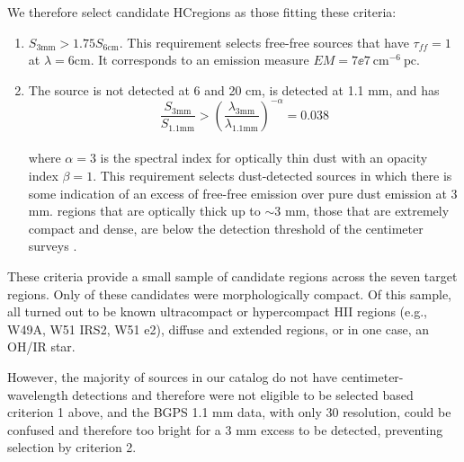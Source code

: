 \documentclass[twocolumn]{aastex62}
\begin{document}
We therefore select candidate HC\hii regions
as those fitting these criteria:
\begin{enumerate}
    \item $S_{3 \mathrm{mm}} > 1.75 S_{6 \mathrm{cm}}$.  %
        This requirement selects free-free sources that have $\tau_{ff}=1$
        at $\lambda = {6 \mathrm{cm}}$.  It corresponds to an emission
        measure ${EM=7\ee{7}~\mathrm{cm}^{-6}~\mathrm{pc}}$.
    \item
        The source is not detected at 6 and 20 cm, is detected at 1.1 mm, and has
        \begin{equation}
            \frac{S_{3 \mathrm{mm}}}{S_{1.1 \mathrm{mm}}} > \left(\frac{\lambda_{3 \mathrm{mm}}}
            {\lambda_{1.1 \mathrm{mm}}}\right)^{-\alpha} = 0.038
        \end{equation}\\
        where $\alpha=3$ is the spectral
        index for optically thin dust with an opacity index $\beta=1$.  This
        requirement selects dust-detected sources in which there is some
        indication of an excess of free-free emission over pure dust emission
        at 3 mm.
        \hchii regions that are optically
        thick up to $\sim3$ mm, those that are extremely compact and dense,
        are below the detection threshold of the centimeter surveys
        \citep[$\approx2.5$ mJy at 6 cm;][]{Giveon2005a,Hoare2012a}.
\end{enumerate}

These criteria provide a small sample of \nhiicand candidate \hchii regions
across the seven target regions.  Only \ncompacthiicand of these candidates
were morphologically compact. Of this sample, all turned out to be known
ultracompact or hypercompact HII regions (e.g., W49A, W51 IRS2, W51 e2),
diffuse and extended regions, or in one case, an OH/IR star. 

However, the majority of sources in our catalog do not have
centimeter-wavelength detections and therefore were not
eligible to be selected based criterion 1 above, and the BGPS 1.1 mm data,
with only 30 \arcsec resolution, could be confused and therefore too bright for
a 3 mm excess to be detected, preventing selection by criterion 2. 
\end{document}
